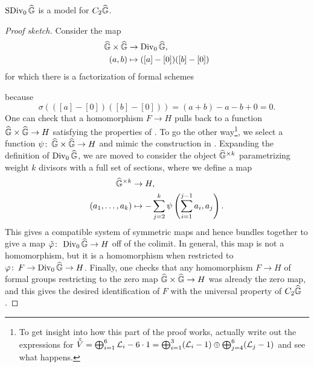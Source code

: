\begin{theorem}
$\operatorname{SDiv}_0 \widehat{\mathbb G}$ is a model for $C_2 \widehat{\mathbb G}$.
\end{theorem}
\begin{proof}[Proof sketch]
Consider the map
\begin{align*}
\widehat{\mathbb G} \times \widehat{\mathbb G} & \to \operatorname{Div}_0 \widehat{\mathbb G}, \\
(a, b) & \mapsto ([a] - [0])([b] - [0])
\end{align*}
for which there is a factorization of formal schemes
\begin{center}
\end{center}
because \[\sigma(([a] - [0])([b] - [0])) = (a + b) - a - b + 0 = 0.\]  One can check that a homomorphism $F \to H$ pulls back to a function $\widehat{\mathbb G} \times \widehat{\mathbb G} \to H$ satisfying the properties of .  To go the other way\footnote{To get insight into how this part of the proof works, actually write out the expressions for $\tilde{\tilde{V}} = \bigoplus_{i=1}^6 \mathcal{L}_i - 6 \cdot 1 = \bigoplus_{i=1}^3 (\mathcal{L}_i - 1) \oplus \bigoplus_{j=4}^6 (\mathcal{L}_j - 1)$ and see what happens.}, we select a function $\psi\colon\thinspace \widehat{\mathbb G} \times \widehat{\mathbb G} \to H$ and mimic the construction in .  Expanding the definition of $\operatorname{Div}_0 \widehat{\mathbb G}$, we are moved to consider the object $\widehat{\mathbb G}^{\times k}$ parametrizing weight $k$ divisors with a full set of sections, where we define a map
\begin{align*}
\widehat{\mathbb G}^{\times k} & \to H, \\
(a_1, \ldots, a_k) & \mapsto -\sum_{j=2}^k \psi\left(\sum_{i=1}^{j-1} a_i, a_j \right).
\end{align*}
This gives a compatible system of symmetric maps and hence bundles together to give a map $\tilde{\varphi}\colon\thinspace\operatorname{Div}_0 \widehat{\mathbb G} \to H$ off of the colimit.  In general, this map is not a homomorphism, but it is a homomorphism when restricted to $\varphi\colon\thinspace F \to \operatorname{Div}_0 \widehat{\mathbb G} \to H$.  Finally, one checks that any homomorphism $F \to H$ of formal groups restricting to the zero map $\widehat{\mathbb G} \times \widehat{\mathbb G} \to H$ was already the zero map, and this gives the desired identification of $F$ with the universal property of $C_2 \widehat{\mathbb G}$.
\end{proof}

